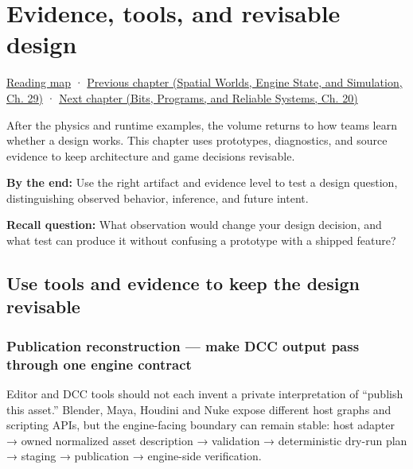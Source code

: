 \chapter{Evidence, tools, and revisable design}\label{06-engine-ii-ch041-evidence-tools-and-revisable-design}\hypertarget{06-engine-ii-ch041}{}\label{stagechapter:06-engine-ii-ch041}

\hyperref[volume-reading-map]{Reading map} · \href{../05-Spatial-Worlds-Engine-State-and-Simulation/main.pdf\#nameddest=06-engine-ii-ch040-coupled-contacts-and-iterative-response}{Previous chapter (Spatial Worlds, Engine State, and Simulation, Ch. 29)} · \href{../01-Bits-Programs-and-Reliable-Systems/main.pdf\#nameddest=06-engine-ii-ch042-from-cartridge-bytes-to-a-reproducible-machine}{Next chapter (Bits, Programs, and Reliable Systems, Ch. 20)}

After the physics and runtime examples, the volume returns to how teams learn whether a design works. This chapter uses prototypes, diagnostics, and source evidence to keep architecture and game decisions revisable.

\textbf{By the end:} Use the right artifact and evidence level to test a design question, distinguishing observed behavior, inference, and future intent.

\textbf{Recall question:} What observation would change your design decision, and what test can produce it without confusing a prototype with a shipped feature?

\section{Use tools and evidence to keep the design revisable}\label{06-engine-ii-ch041-use-tools-and-evidence-to-keep-the-design-revisable}

\subsection{Publication reconstruction --- make DCC output pass through one engine contract}\label{06-engine-ii-ch041-publication-reconstruction-make-dcc-output-pass-through-one-engine-contract}

Editor and DCC tools should not each invent a private interpretation of ``publish this asset.'' Blender, Maya, Houdini and Nuke expose different host graphs and scripting APIs, but the engine-facing boundary can remain stable: host adapter → owned normalized asset description → validation → deterministic dry-run plan → staging → publication → engine-side verification.


